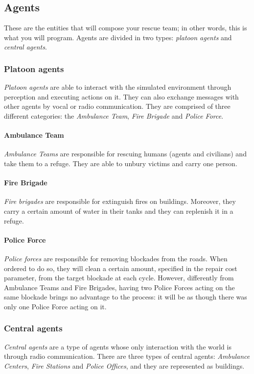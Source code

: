 \documentclass{article}
\begin{document}
\subsection{Agents}

These are the entities that will compose your rescue team; in other words, this is what you will program. Agents are divided in two types: \emph{platoon agents} and \emph{central agents}.

\subsubsection{Platoon agents}

\emph{Platoon agents} are able to interact with the simulated environment through perception and executing actions on it. They can also exchange messages with other agents by vocal or radio communication. They are comprised of three different categories: the \emph{Ambulance Team}, \emph{Fire Brigade} and \emph{Police Force}.

\paragraph{Ambulance Team}

\emph{Ambulance Teams} are responsible for rescuing humans (agents and civilians) and take them to a refuge. They are able to unbury victims and carry one person.

\paragraph{Fire Brigade}

\emph{Fire brigades} are responsible for extinguish fires on buildings. Moreover, they carry a certain amount of water in their tanks and they can replenish it in a refuge.

\paragraph{Police Force}

\emph{Police forces} are responsible for removing blockades from the roads. When ordered to do so, they will clean a certain amount, specified in the repair cost parameter, from the target blockade at each cycle. However, differently from Ambulance Teams and Fire Brigades, having two Police Forces acting on the same blockade brings no advantage to the process: it will be as though there was only one Police Force acting on it.
\subsubsection{Central agents}
\emph{Central agents} are a type of agents whose only interaction with the world is through radio communication. There are three types of central agents: \emph{Ambulance Centers}, \emph{Fire Stations} and \emph{Police Offices}, and they are represented as buildings.
\end{document}
